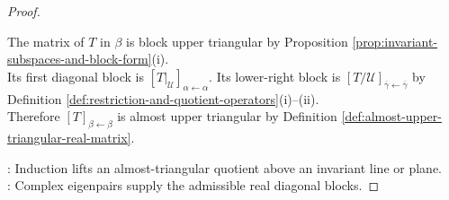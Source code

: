 \begin{theorem}
\begin{proof}
\begin{enumerate}[label=(\roman*)]
The matrix of $T$ in $\beta$ is block upper triangular by Proposition \ref{prop:invariant-subspaces-and-block-form}(i).\\
Its first diagonal block is $[T|_{\mathcal{U}}]_{\alpha\leftarrow\alpha}$. Its lower-right block is $[T/\mathcal{U}]_{\overline{\gamma}\leftarrow\overline{\gamma}}$ by Definition \ref{def:restriction-and-quotient-operators}(i)--(ii).\\
Therefore $[T]_{\beta\leftarrow\beta}$ is almost upper triangular by Definition \ref{def:almost-upper-triangular-real-matrix}.
\end{enumerate}
: Induction lifts an almost-triangular quotient above an invariant line or plane.\\
: Complex eigenpairs supply the admissible real diagonal blocks.
\end{proof}
\end{theorem}

